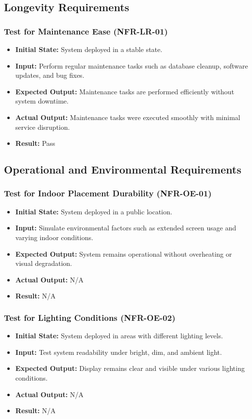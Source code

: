 \documentclass[12pt, titlepage]{article}
\begin{document}
\subsection{Longevity Requirements}

\subsubsection{Test for Maintenance Ease (NFR-LR-01)}
\begin{itemize}
    \item \textbf{Initial State: }System deployed in a stable state.
    \item \textbf{Input: }Perform regular maintenance tasks such as database cleanup, software updates, and bug fixes.
    \item \textbf{Expected Output: }Maintenance tasks are performed efficiently without system downtime.
    \item \textbf{Actual Output: }Maintenance tasks were executed smoothly with minimal service disruption.
    \item \textbf{Result: }Pass
\end{itemize}

\subsection{Operational and Environmental Requirements}

\subsubsection{Test for Indoor Placement Durability (NFR-OE-01)}
\begin{itemize}
    \item \textbf{Initial State: }System deployed in a public location.
    \item \textbf{Input: }Simulate environmental factors such as extended screen usage and varying indoor conditions.
    \item \textbf{Expected Output: }System remains operational without overheating or visual degradation.
    \item \textbf{Actual Output: } N/A
    \item \textbf{Result: }N/A
\end{itemize}

\subsubsection{Test for Lighting Conditions (NFR-OE-02)}
\begin{itemize}
    \item \textbf{Initial State: }System deployed in areas with different lighting levels.
    \item \textbf{Input: }Test system readability under bright, dim, and ambient light.
    \item \textbf{Expected Output: }Display remains clear and visible under various lighting conditions.
    \item \textbf{Actual Output: } N/A
    \item \textbf{Result: }N/A
\end{itemize}
\end{document}
